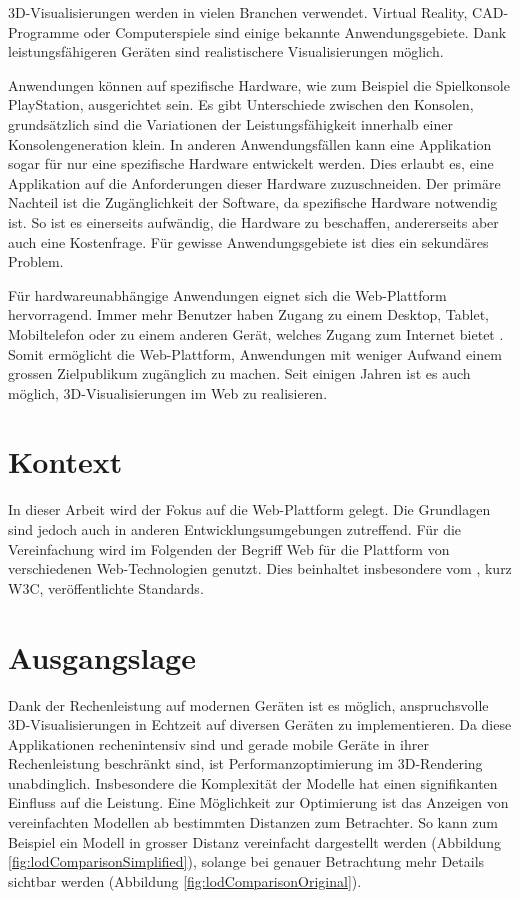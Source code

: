 
3D-Visualisierungen werden in vielen Branchen verwendet. Virtual Reality, CAD-Programme oder Computerspiele sind einige bekannte Anwendungsgebiete. Dank leistungsfähigeren Geräten sind realistischere Visualisierungen möglich.

Anwendungen können auf spezifische Hardware, wie zum Beispiel die Spielkonsole PlayStation, ausgerichtet sein. Es gibt Unterschiede zwischen den Konsolen, grundsätzlich sind die Variationen der Leistungsfähigkeit innerhalb einer Konsolengeneration klein. In anderen Anwendungsfällen kann eine Applikation sogar für nur eine spezifische Hardware entwickelt werden. Dies erlaubt es, eine Applikation auf die Anforderungen dieser Hardware zuzuschneiden. Der primäre Nachteil ist die Zugänglichkeit der Software, da spezifische Hardware notwendig ist. So ist es einerseits aufwändig, die Hardware zu beschaffen, andererseits aber auch eine Kostenfrage. Für gewisse Anwendungsgebiete ist dies ein sekundäres Problem.

Für hardwareunabhängige Anwendungen eignet sich die Web-Plattform hervorragend.
Immer mehr Benutzer haben Zugang zu einem Desktop, Tablet, Mobiltelefon oder zu einem anderen Gerät, welches Zugang zum Internet bietet \cite{peopleWithInternetAccess}.
Somit ermöglicht die Web-Plattform, Anwendungen mit weniger Aufwand einem grossen Zielpublikum zugänglich zu machen.
Seit einigen Jahren ist es auch möglich, 3D-Visualisierungen im Web zu realisieren.

\section{Kontext}
In dieser Arbeit wird der Fokus auf die Web-Plattform gelegt. Die Grundlagen sind jedoch auch in anderen Entwicklungsumgebungen zutreffend.
Für die Vereinfachung wird im Folgenden der Begriff Web für die Plattform von verschiedenen Web-Technologien genutzt. Dies beinhaltet insbesondere vom , kurz W3C, veröffentlichte Standards.

\section{Ausgangslage}
Dank der Rechenleistung auf modernen Geräten ist es möglich, anspruchsvolle 3D-Visualisierungen in Echtzeit auf diversen Geräten zu implementieren. Da diese Applikationen rechenintensiv sind und gerade mobile Geräte in ihrer Rechenleistung beschränkt sind, ist Performanzoptimierung im 3D-Rendering unabdinglich. Insbesondere die Komplexität der Modelle hat einen signifikanten Einfluss auf die Leistung.
Eine Möglichkeit zur Optimierung ist das Anzeigen von vereinfachten Modellen ab bestimmten Distanzen zum Betrachter. So kann zum Beispiel ein Modell in grosser Distanz vereinfacht dargestellt werden (Abbildung \ref{fig:lodComparisonSimplified}), solange bei genauer Betrachtung mehr Details sichtbar werden (Abbildung \ref{fig:lodComparisonOriginal}).

